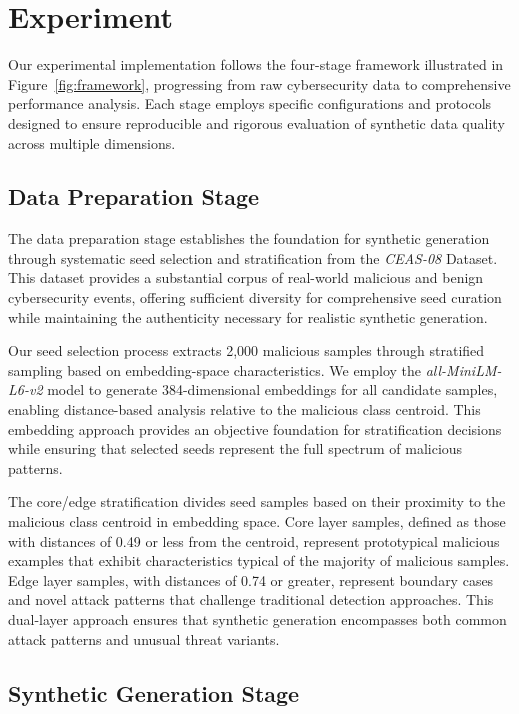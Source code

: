 \section{Experiment}
\label{sec:experiment}
Our experimental implementation follows the four-stage framework illustrated in Figure~\ref{fig:framework}, progressing from raw cybersecurity data to comprehensive performance analysis. Each stage employs specific configurations and protocols designed to ensure reproducible and rigorous evaluation of synthetic data quality across multiple dimensions.

\subsection{Data Preparation Stage}

The data preparation stage establishes the foundation for synthetic generation through systematic seed selection and stratification from the \textit{CEAS-08} Dataset. This dataset provides a substantial corpus of real-world malicious and benign cybersecurity events, offering sufficient diversity for comprehensive seed curation while maintaining the authenticity necessary for realistic synthetic generation.

Our seed selection process extracts 2,000 malicious samples through stratified sampling based on embedding-space characteristics. We employ the \textit{all-MiniLM-L6-v2} model to generate 384-dimensional embeddings for all candidate samples, enabling distance-based analysis relative to the malicious class centroid. This embedding approach provides an objective foundation for stratification decisions while ensuring that selected seeds represent the full spectrum of malicious patterns.

The core/edge stratification divides seed samples based on their proximity to the malicious class centroid in embedding space. Core layer samples, defined as those with distances of 0.49 or less from the centroid, represent prototypical malicious examples that exhibit characteristics typical of the majority of malicious samples. Edge layer samples, with distances of 0.74 or greater, represent boundary cases and novel attack patterns that challenge traditional detection approaches. This dual-layer approach ensures that synthetic generation encompasses both common attack patterns and unusual threat variants.

\subsection{Synthetic Generation Stage}

